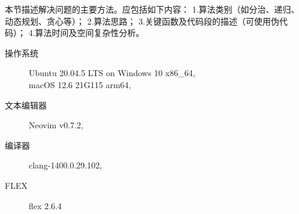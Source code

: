 本节描述解决问题的主要方法。应包括如下内容：
1.算法类别（如分治、递归、动态规划、贪心等）；
2.算法思路；
3.关键函数及代码段的描述（可使用伪代码）；
4.算法时间及空间复杂性分析。
\begin{description}
	\item[操作系统] Ubuntu 20.04.5 LTS on Windows 10 x86\_64, \\
		macOS 12.6 21G115 arm64,
	\item[文本编辑器] Neovim v0.7.2,
	\item[编译器] clang-1400.0.29.102,
	\item[FLEX] flex 2.6.4
\end{description}
